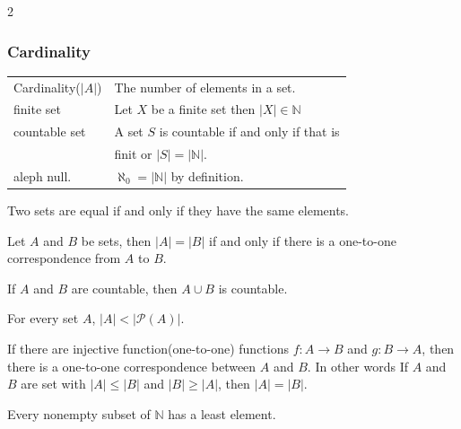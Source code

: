 \documentclass[5pt]{article}
\begin{document}
\begin{multicols}{2}
\subsubsection{Cardinality}
\begin{tabular}{ll}
    Cardinality($|A|$)  & The number of elements in a set.\\
    finite set          & Let $X$ be a finite set then $|X|\in \mathbb{N}$\\
    countable set       & A set $S$ is countable if and only if that is\\
                        & finit or $|S|=|\mathbb{N}|$.\\
    aleph null.         & $\aleph_0=|\mathbb{N}|$ by definition.\\
\end{tabular}

\begin{axiom}
    Two sets are equal if and only if they have the same elements.
\end{axiom}

\begin{theorem}
    Let $A$ and $B$ be sets, then $|A|=|B|$ if and only if there is a one-to-one correspondence from $A$ to $B$.
\end{theorem}

\begin{theorem}
    If $A$ and $B$ are countable, then $A\cup B$ is countable. 
\end{theorem}

\begin{theorem}
    For every set $A$, $|A|<|\mathcal{P}(A)|$.
\end{theorem}

\begin{theorem}
     If there are injective function(one-to-one) functions $f\!:A\to B$ and $g\!:B\to A$, then there is a one-to-one correspondence between $A$ and $B$. 
     In other words If $A$ and $B$ are set with $|A|\le|B|$ and $|B|\ge|A|$, then $|A|=|B|$.
\end{theorem}

\begin{theorem}
    Every nonempty subset of $\mathbb{N}$ has a least element.
\end{theorem}


\end{multicols}
\end{document}
